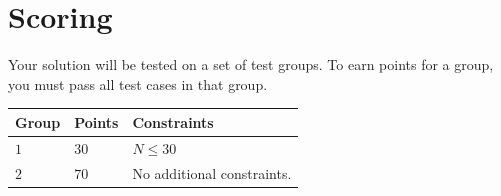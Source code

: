 \section*{Scoring}
Your solution will be tested on a set of test groups.
To earn points for a group, you must pass all test cases in that group.

\noindent
\begin{tabular}{| l | l | p{12cm} |}
  \hline
  \textbf{Group} & \textbf{Points} & \textbf{Constraints} \\ \hline
  $1$    & $30$       & $N \leq 30$ \\ \hline
  $2$    & $70$       & No additional constraints. \\ \hline
\end{tabular}
